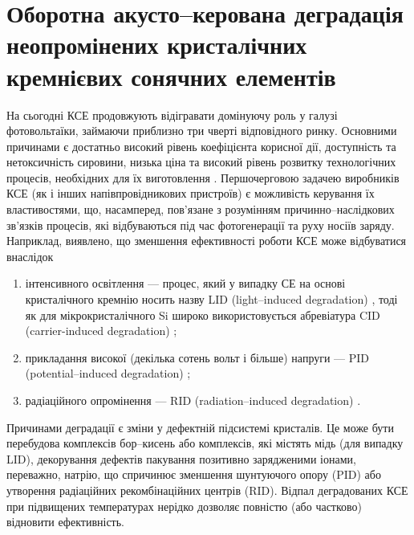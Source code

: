 \section{Оборотна акусто--керована деградація неопромінених кристалічних кремнієвих сонячних елементів\label{USID}}

На сьогодні КСЕ продовжують відігравати домінуючу роль у галузі фотовольтаїки, займаючи приблизно три чверті відповідного ринку.
Основними причинами є достатньо високий рівень коефіцієнта корисної дії, доступність та нетоксичність сировини,
низька ціна та високий рівень розвитку технологічних процесів, необхідних для їх виготовлення \cite{Si:Hu}.
Першочерговою задачею виробників КСЕ (як і інших напівпровідникових пристроїв) є можливість керування їх властивостями,
що, насамперед, пов'язане з розумінням причинно--наслідкових зв'язків процесів, які відбуваються під час фотогенерації та руху носіїв заряду.
Наприклад, виявлено, що зменшення ефективності роботи КСЕ може відбуватися внаслідок
\begin{enumerate}[label=\asbuk*),leftmargin=0em,itemindent=1.5em]
  \item інтенсивного освітлення --- процес, який у випадку СЕ на основі кристалічного кремнію носить назву LID (light--induced degradation) \cite{LID:SchmidtJMR,LIDRev,LIDRev2,LID:JAP2017II}, тоді як для мікрокристалічного Si широко використовується абревіатура CID (carrier-induced degradation) \cite{CID:APL,CID:PPS};
  \item прикладання високої (декілька сотень вольт і більше) напруги --- PID  (potential--induced degradation) \cite{PID:SEMSC,PID:PP,PID:2017};
  \item радіаційного опромінення ---  RID (radiation--induced degradation) \cite{Bhat,Karazhanov}.
\end{enumerate}
Причинами деградації є зміни у дефектній підсистемі кристалів.
Це може бути перебудова комплексів бор--кисень або комплексів, які містять мідь (для випадку LID),
декорування дефектів пакування позитивно зарядженими іонами, переважно, натрію, що спричинює зменшення шунтуючого опору (PID)
або утворення радіаційних рекомбінаційних центрів (RID).
Відпал деградованих КСЕ при підвищених температурах нерідко дозволяє повністю (або частково) відновити ефективність.

